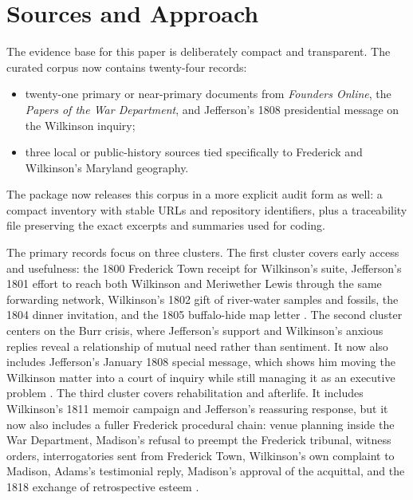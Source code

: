 \section{Sources and Approach}

The evidence base for this paper is deliberately compact and transparent. The curated corpus now contains twenty-four records:

\begin{itemize}[leftmargin=1.4em]
  \item twenty-one primary or near-primary documents from \emph{Founders Online}, the \emph{Papers of the War Department}, and Jefferson's 1808 presidential message on the Wilkinson inquiry;
  \item three local or public-history sources tied specifically to Frederick and Wilkinson's Maryland geography.
\end{itemize}

The package now releases this corpus in a more explicit audit form as well: a compact inventory with stable URLs and repository identifiers, plus a traceability file preserving the exact excerpts and summaries used for coding.

The primary records focus on three clusters. The first cluster covers early access and usefulness: the 1800 Frederick Town receipt for Wilkinson's suite, Jefferson's 1801 effort to reach both Wilkinson and Meriwether Lewis through the same forwarding network, Wilkinson's 1802 gift of river-water samples and fossils, the 1804 dinner invitation, and the 1805 buffalo-hide map letter \citep{wardepartment1800receipt,jefferson1801,wilkinson1802,wilkinson1804jefferson,wilkinson1805}. The second cluster centers on the Burr crisis, where Jefferson's support and Wilkinson's anxious replies reveal a relationship of mutual need rather than sentiment. It now also includes Jefferson's January 1808 special message, which shows him moving the Wilkinson matter into a court of inquiry while still managing it as an executive problem \citep{jefferson1807,wilkinson1807a,wilkinson1807b,jefferson1808message}. The third cluster covers rehabilitation and afterlife. It includes Wilkinson's 1811 memoir campaign and Jefferson's reassuring response, but it now also includes a fuller Frederick procedural chain: venue planning inside the War Department, Madison's refusal to preempt the Frederick tribunal, witness orders, interrogatories sent from Frederick Town, Wilkinson's own complaint to Madison, Adams's testimonial reply, Madison's approval of the acquittal, and the 1818 exchange of retrospective esteem \citep{wilkinson1811,jefferson1811,eustis1811a,madison1811eustis,eustis1811b,kinson1811,wilkinson1811madison,adams1811wilkinson,madison1812,jefferson1818,wilkinson1818}.

